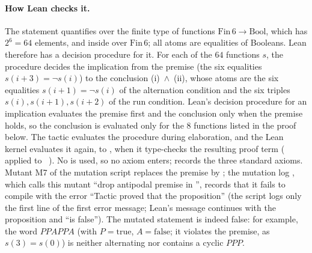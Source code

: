\paragraph{How Lean checks it.} The statement quantifies over the finite type of functions
$\mathrm{Fin}\,6\to\mathrm{Bool}$, which has $2^6=64$ elements, and inside over $\mathrm{Fin}\,6$; all atoms are
equalities of Booleans. Lean therefore has a decision procedure for it. For each of the $64$ functions $s$, the
procedure decides the implication from the premise (the six equalities $s(i+3)=\neg s(i)$) to the conclusion
(i)~$\wedge$~(ii), whose atoms are the six equalities $s(i+1)=\neg s(i)$ of the alternation condition and the six
triples $s(i),s(i+1),s(i+2)$ of the run condition. Lean's decision procedure for an implication evaluates the
premise first and the conclusion only when the premise holds, so the conclusion is evaluated only for the $8$
functions listed in the proof below. The tactic  evaluates the procedure during elaboration, and the
Lean kernel evaluates it again, to , when it type-checks the resulting proof term
( applied to ~). No
 is used, so no  axiom enters; 
records the three standard axioms. Mutant M7 of the mutation script  replaces the
premise by ; the mutation log , which calls this mutant ``drop
antipodal premise in '', records that it fails to compile with the error ``Tactic
 proved that the proposition'' (the script logs only the first line of the first error message;
Lean's message continues with the proposition and ``is false''). The mutated statement is indeed false: for
example, the word $PPAPPA$ (with $P=\mathrm{true}$, $A=\mathrm{false}$; it violates the premise, as $s(3)=s(0)$) is
neither alternating nor contains a cyclic $PPP$.

